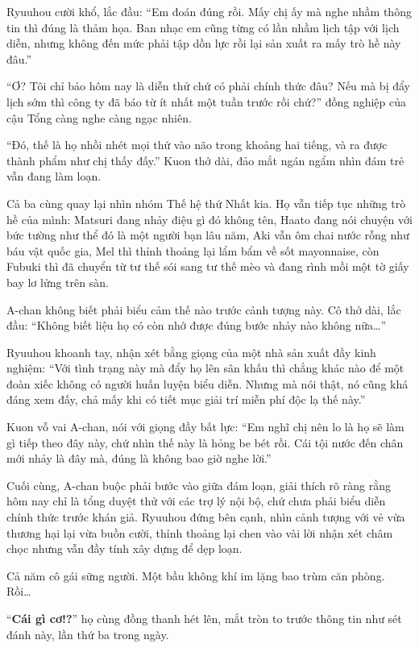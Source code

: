 \documentclass[../main.tex]{subfiles}
\begin{document}
Ryuuhou cười khổ, lắc đầu: ``Em đoán đúng rồi. Mấy chị ấy mà nghe nhầm thông tin thì đúng là thảm họa. Ban nhạc em cũng từng có lần nhầm lịch tập với lịch diễn, nhưng không đến mức phải tập dồn lực rồi lại sản xuất ra mấy trò hề này đâu.''

``Ơ? Tôi chỉ bảo hôm nay là diễn thử chứ có phải chính thức đâu? Nếu mà bị đẩy lịch sớm thì công ty đã báo từ ít nhất một tuần trước rồi chứ?'' đồng nghiệp của cậu Tổng càng nghe càng ngạc nhiên.

``Đó, thế là họ nhồi nhét mọi thứ vào não trong khoảng hai tiếng, và ra được thành phẩm như chị thấy đấy.'' Kuon thở dài, đảo mắt ngán ngẩm nhìn đám trẻ vẫn đang làm loạn.

Cả ba cùng quay lại nhìn nhóm Thế hệ thứ Nhất kia. Họ vẫn tiếp tục những trò hề của mình: Matsuri đang nhảy điệu gì đó không tên, Haato đang nói chuyện với bức tường như thể đó là một người bạn lâu năm, Aki vẫn ôm chai nước rỗng như báu vật quốc gia, Mel thì thỉnh thoảng lại lẩm bẩm về sốt mayonnaise, còn Fubuki thì đã chuyển từ tư thế sói sang tư thế mèo và đang rình mồi một tờ giấy bay lơ lửng trên sàn.

A-chan không biết phải biểu cảm thế nào trước cảnh tượng này. Cô thở dài, lắc đầu: ``Không biết liệu họ có còn nhớ được đúng bước nhảy nào không nữa\dots''

Ryuuhou khoanh tay, nhận xét bằng giọng của một nhà sản xuất đầy kinh nghiệm: ``Với tình trạng này mà đẩy họ lên sân khấu thì chẳng khác nào để một đoàn xiếc không có người huấn luyện biểu diễn. Nhưng mà nói thật, nó cũng khá đáng xem đấy, chả mấy khi có tiết mục giải trí miễn phí độc lạ thế này.''

Kuon vỗ vai A-chan, nói với giọng đầy bất lực: ``Em nghĩ chị nên lo là họ sẽ làm gì tiếp theo đây này, chứ nhìn thế này là hỏng be bét rồi. Cái tội nước đến chân mới nhảy là đây mà, đúng là không bao giờ nghe lời.''

Cuối cùng, A-chan buộc phải bước vào giữa đám loạn, giải thích rõ ràng rằng hôm nay chỉ là tổng duyệt thử với các trợ lý nội bộ, chứ chưa phải biểu diễn chính thức trước khán giả. Ryuuhou đứng bên cạnh, nhìn cảnh tượng với vẻ vừa thương hại lại vừa buồn cười, thỉnh thoảng lại chen vào vài lời nhận xét châm chọc nhưng vẫn đầy tính xây dựng để dẹp loạn.

Cả năm cô gái sững người. Một bầu không khí im lặng bao trùm căn phòng. Rồi\dots

``\textbf{Cái gì cơ!?}'' họ cùng đồng thanh hét lên, mắt tròn to trước thông tin như sét đánh này, lần thứ ba trong ngày.
\end{document}

